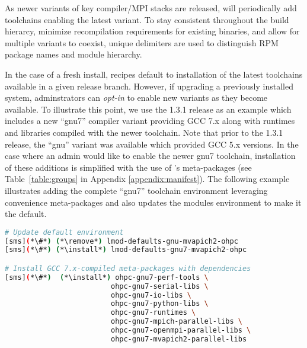 As newer variants of key compiler/MPI stacks are released, \OHPC{} will
periodically add toolchains enabling the latest variant. To stay consistent
throughout the build hierarcy, minimize recompilation requirements for existing
binaries, and allow for multiple variants to coexist, unique delimiters are
used to distinguish RPM package names and module hierarchy.

In the case of a fresh install, \OHPC{} recipes default to installation of the
latest toolchains available in a given release branch. However, if upgrading a
previously installed system, adminstrators can {\em opt-in} to enable new
variants as they become available. To illustrate this point, we use the \OHPC{}
1.3.1 release as an example which includes a new {``gnu7''} compiler variant
providing GCC 7.x along with runtimes and libraries compiled
with the newer toolchain. Note that prior to the 1.3.1 release, the {``gnu''} variant was
available which provided GCC 5.x versions.
In the case where an admin would like to enable the newer {gnu7} toolchain,
installation of these additions is simplified
with the use of \OHPC{}'s meta-packages (see Table~\ref{table:groups} in Appendix 
\ref{appendix:manifest}).
The following example illustrates adding the complete ``gnu7'' toolchain
environment leveraging convenience meta-packages and also updates the modules environment to make it the default.

\begin{lstlisting}[language=bash,keywords={}]
# Update default environment
[sms](*\#*) (*\remove*) lmod-defaults-gnu-mvapich2-ohpc
[sms](*\#*) (*\install*) lmod-defaults-gnu7-mvapich2-ohpc

# Install GCC 7.x-compiled meta-packages with dependencies
[sms](*\#*)  (*\install*) ohpc-gnu7-perf-tools \
                         ohpc-gnu7-serial-libs \
                         ohpc-gnu7-io-libs \
                         ohpc-gnu7-python-libs \
                         ohpc-gnu7-runtimes \
                         ohpc-gnu7-mpich-parallel-libs \
                         ohpc-gnu7-openmpi-parallel-libs \
                         ohpc-gnu7-mvapich2-parallel-libs
\end{lstlisting}

